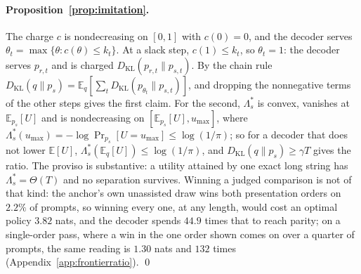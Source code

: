 \paragraph{Proposition~\ref{prop:imitation}.}
The charge $c$ is nondecreasing on $[0,1]$ with $c(0) = 0$, and the decoder serves
$\theta_t = \max\{\theta : c(\theta) \le k_t\}$. At a slack step, $c(1) \le k_t$, so $\theta_t = 1$: the
decoder serves $p_{r,t}$ and is charged $D_{\mathrm{KL}}(p_{r,t} \| p_{s,t})$. By the chain rule
$D_{\mathrm{KL}}(q \| p_s) = \mathbb{E}_q[\sum_t D_{\mathrm{KL}}(p_{\theta_t} \| p_{s,t})]$, and dropping the
nonnegative terms of the other steps gives the first claim. For the second, $\Lambda^*_s$ is convex,
vanishes at $\mathbb{E}_{p_s}[U]$ and is nondecreasing on $[\mathbb{E}_{p_s}[U], u_{\max}]$, where
$\Lambda^*_s(u_{\max}) = -\log\Pr_{p_s}[U = u_{\max}] \le \log(1/\pi)$; so for a decoder that does not lower
$\mathbb{E}[U]$, $\Lambda^*_s(\mathbb{E}_q[U]) \le \log(1/\pi)$, and $D_{\mathrm{KL}}(q\|p_s) \ge \gamma T$
gives the ratio. The proviso is substantive: a utility attained by one exact long
string has $\Lambda^*_s = \Theta(T)$ and no separation survives. Winning a judged comparison is not of that
kind: the anchor's own unassisted draw wins both presentation orders on $2.2\%$ of prompts, so winning every one, at any length, would cost an optimal policy $3.82$ nats, and the decoder spends $44.9$ times that to reach parity; on a single-order pass, where a win in the one order shown comes on over a quarter of prompts, the same reading is $1.30$ nats and $132$ times (Appendix~\ref{app:frontierratio}). \qed

